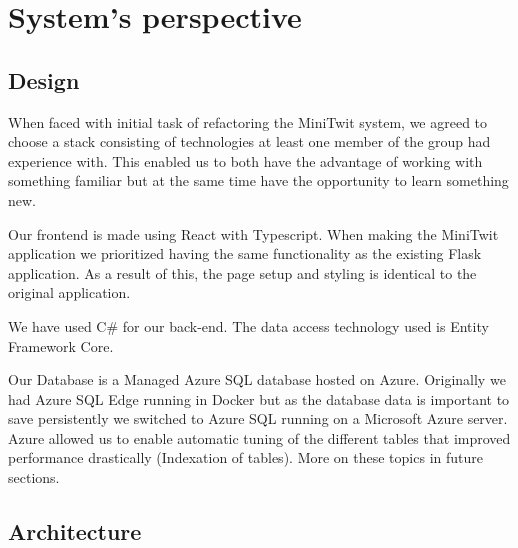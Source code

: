 \section{System's perspective}
\subsection{Design}
When faced with initial task of refactoring the MiniTwit system, we agreed to choose a stack consisting of technologies at least one member of the group had experience with.
This enabled us to both have the advantage of working with something familiar but at the same time have the opportunity to learn something new. 

Our frontend is made using React with Typescript. When making the MiniTwit application we prioritized having the same functionality as the existing Flask application. As a result of this, the page setup and styling is identical to the original application.

We have used C\# for our back-end. The data access technology used is Entity Framework Core.

Our Database is a Managed Azure SQL database hosted on Azure. Originally we had Azure SQL Edge running in Docker but as the database data is important to save persistently we switched to Azure SQL running on a Microsoft Azure server. Azure allowed us to enable automatic tuning of the different tables that improved performance drastically (Indexation of tables). More on these topics in future sections.


\subsection{Architecture}


